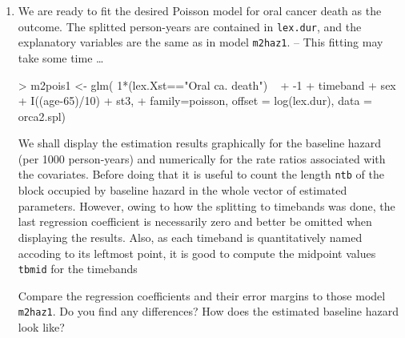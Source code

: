 \begin{enumerate}
\item
We are ready to fit the desired Poisson model for oral cancer death
as the outcome. The splitted person-years are contained in {\tt lex.dur},
and the explanatory variables are the same as in model {\tt m2haz1}.
-- This fitting may take some time \dots
\begin{Schunk}
\begin{Sinput}
> m2pois1 <- glm( 1*(lex.Xst=="Oral ca. death")  ~
+       -1 + timeband + sex + I((age-65)/10) + st3,
+       family=poisson, offset = log(lex.dur), data = orca2.spl)
\end{Sinput}
\end{Schunk}
We shall display the estimation results graphically
 for the baseline hazard (per 1000 person-years)
 and numerically for the rate ratios associated with the covariates.
Before doing that it is useful to count the length \texttt{ntb} of the
 block occupied by baseline hazard in the whole vector of estimated parameters.
However, owing to how the splitting to timebands was done, the last regression
coefficient is necessarily
zero and better be omitted when displaying the results. Also, as each timeband
is quantitatively
named accoding to its leftmost point, it is good to compute the midpoint values \texttt{tbmid}
for the timebands
\begin{Schunk}
\end{Schunk}

Compare the regression coefficients and their error margins
to those model {\tt m2haz1}. Do you find any differences?
How does the estimated baseline hazard look like?


\end{enumerate}
